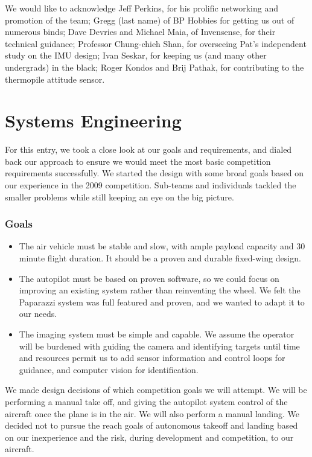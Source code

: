 \documentclass[10pt]{report}
\begin{document}
We would like to acknowledge
Jeff Perkins, for his prolific networking and promotion of the team;
Gregg (last name) of BP Hobbies for getting us out of numerous binds;
Dave Devries and Michael Maia, of Invensense, for their technical guidance;
Professor Chung-chieh Shan, for overseeing Pat's independent study on the IMU design;
Ivan Seskar, for keeping us (and many other undergrads) in the black;
Roger Kondos and Brij Pathak, for contributing to the thermopile attitude sensor.

\section{Systems Engineering}

For this entry, we took a close look at our goals and requirements, and dialed back our approach to ensure we would meet the most basic competition requirements successfully.
We started the design with some broad goals based on our experience in the 2009 competition. 
Sub-teams and individuals tackled the smaller problems while still keeping an eye on the big picture. 

\subsubsection{Goals}
\begin{itemize}
	\item The air vehicle must be stable and slow, with ample payload capacity and 30 minute flight duration. It should be a proven and durable fixed-wing design.
	\item The autopilot must be based on proven software, so we could focus on improving an existing system rather than reinventing the wheel. We felt the Paparazzi system was full featured and proven, and we wanted to adapt it to our needs.
	\item The imaging system must be simple and capable. We assume the operator will be burdened with guiding the camera and identifying targets until time and resources permit us to add sensor information and control loops for guidance, and computer vision for identification.
\end{itemize}

We made design decisions of which competition goals we will attempt. 
We will be performing a manual take off, and giving the autopilot system control of the aircraft once the plane is in the air. We will also perform a manual landing. We decided not to pursue the reach goals of autonomous takeoff and landing based on our inexperience and the risk, during development and competition, to our aircraft.
\end{document}
